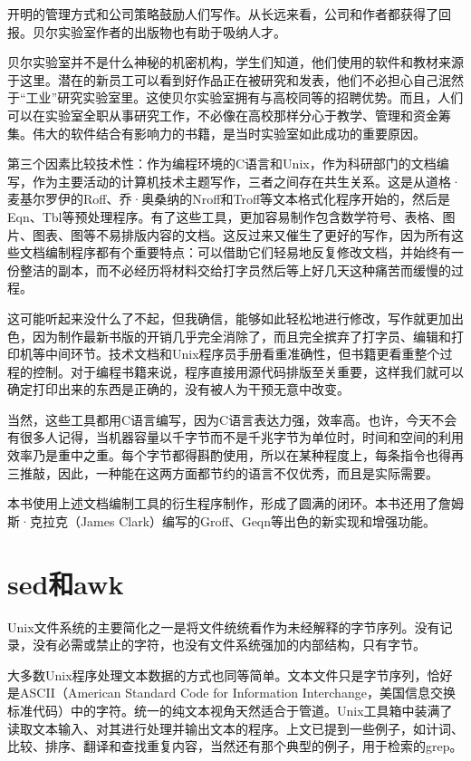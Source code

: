 \documentclass[a4paper,12pt,UTF8,twoside]{ctexbook}
\begin{document}
开明的管理方式和公司策略鼓励人们写作。从长远来看，公司和作者都获得了回报。贝尔实验室作者的出版物也有助于吸纳人才。

贝尔实验室并不是什么神秘的机密机构，学生们知道，他们使用的软件和教材来源于这里。潜在的新员工可以看到好作品正在被研究和发表，他们不必担心自己泯然于“工业”研究实验室里。这使贝尔实验室拥有与高校同等的招聘优势。而且，人们可以在实验室全职从事研究工作，不必像在高校那样分心于教学、管理和资金筹集。伟大的软件结合有影响力的书籍，是当时实验室如此成功的重要原因。

第三个因素比较技术性：作为编程环境的C语言和Unix，作为科研部门的文档编写，作为主要活动的计算机技术主题写作，三者之间存在共生关系。这是从道格·麦基尔罗伊的Roff、乔·奥桑纳的Nroff和Troff等文本格式化程序开始的，然后是Eqn、Tbl等预处理程序。有了这些工具，更加容易制作包含数学符号、表格、图片、图表、图等不易排版内容的文档。这反过来又催生了更好的写作，因为所有这些文档编制程序都有个重要特点：可以借助它们轻易地反复修改文档，并始终有一份整洁的副本，而不必经历将材料交给打字员然后等上好几天这种痛苦而缓慢的过程。

这可能听起来没什么了不起，但我确信，能够如此轻松地进行修改，写作就更加出色，因为制作最新书版的开销几乎完全消除了，而且完全摈弃了打字员、编辑和打印机等中间环节。技术文档和Unix程序员手册看重准确性，但书籍更看重整个过程的控制。对于编程书籍来说，程序直接用源代码排版至关重要，这样我们就可以确定打印出来的东西是正确的，没有被人为干预无意中改变。

当然，这些工具都用C语言编写，因为C语言表达力强，效率高。也许，今天不会有很多人记得，当机器容量以千字节而不是千兆字节为单位时，时间和空间的利用效率乃是重中之重。每个字节都得斟酌使用，所以在某种程度上，每条指令也得再三推敲，因此，一种能在这两方面都节约的语言不仅优秀，而且是实际需要。

本书使用上述文档编制工具的衍生程序制作，形成了圆满的闭环。本书还用了詹姆斯·克拉克（James Clark）编写的Groff、Geqn等出色的新实现和增强功能。

\section{sed和awk}

Unix文件系统的主要简化之一是将文件统统看作为未经解释的字节序列。没有记录，没有必需或禁止的字符，也没有文件系统强加的内部结构，只有字节。

大多数Unix程序处理文本数据的方式也同等简单。文本文件只是字节序列，恰好是ASCII（American Standard Code for Information Interchange，美国信息交换标准代码）中的字符。统一的纯文本视角天然适合于管道。Unix工具箱中装满了读取文本输入、对其进行处理并输出文本的程序。上文已提到一些例子，如计词、比较、排序、翻译和查找重复内容，当然还有那个典型的例子，用于检索的grep。
\end{document}
